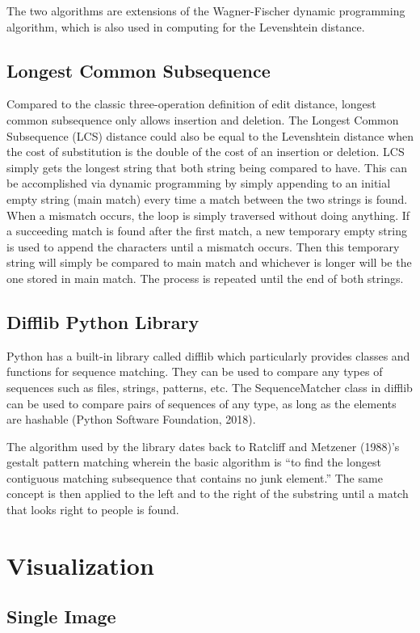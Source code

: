 The two algorithms are extensions of the Wagner-Fischer dynamic programming algorithm, which is also used in computing for the Levenshtein distance.

\subsection{Longest Common Subsequence}
Compared to the classic three-operation definition of edit distance, longest common subsequence only allows insertion and deletion. The Longest Common Subsequence (LCS) distance could also be equal to the Levenshtein distance when the cost of substitution is the double of the cost of an insertion or deletion. LCS simply gets the longest string that both string being compared to have. This can be accomplished via dynamic programming by simply appending to an initial empty string (main match) every time a match between the two strings is found. When a mismatch occurs, the loop is simply traversed without doing anything. If a succeeding match is found after the first match, a new temporary empty string is used to append the characters until a mismatch occurs. Then this temporary string will simply be compared to main match and whichever is longer will be the one stored in main match. The process is repeated until the end of both strings.

\subsection{Difflib Python Library}
Python has a built-in library called difflib which particularly provides classes and functions for sequence matching. They can be used to compare any types of sequences such as files, strings, patterns, etc. The SequenceMatcher class in difflib can be used to compare pairs of sequences of any type, as long as the elements are hashable (Python Software Foundation, 2018).

The algorithm used by the library dates back to Ratcliff and Metzener (1988)’s gestalt pattern matching wherein the basic algorithm is “to find the longest contiguous matching subsequence that contains no junk element.” The same concept is then applied to the left and to the right of the substring until a match that looks right to people is found.

\section{Visualization}
\subsection{Single Image}

